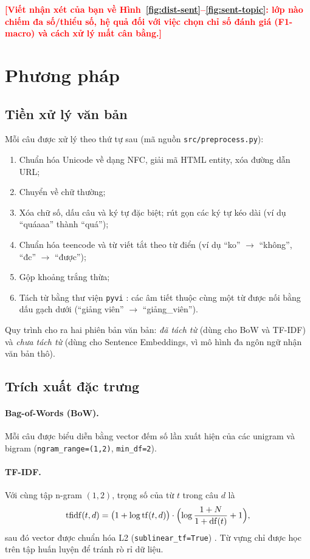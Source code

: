 \documentclass[12pt,a4paper]{article}
\newcommand{\todo}[1]{\textcolor{red}{\textbf{[#1]}}}
\begin{document}
\todo{Viết nhận xét của bạn về Hình~\ref{fig:dist-sent}--\ref{fig:sent-topic}: lớp nào chiếm đa số/thiểu số, hệ quả đối với việc chọn chỉ số đánh giá (F1-macro) và cách xử lý mất cân bằng.}

\section{Phương pháp}
\subsection{Tiền xử lý văn bản}
Mỗi câu được xử lý theo thứ tự sau (mã nguồn \texttt{src/preprocess.py}):
\begin{enumerate}
  \item Chuẩn hóa Unicode về dạng NFC, giải mã HTML entity, xóa đường dẫn URL;
  \item Chuyển về chữ thường;
  \item Xóa chữ số, dấu câu và ký tự đặc biệt; rút gọn các ký tự kéo dài (ví dụ ``quáaaa'' thành ``quá'');
  \item Chuẩn hóa teencode và từ viết tắt theo từ điển (ví dụ ``ko'' $\rightarrow$ ``không'', ``đc'' $\rightarrow$ ``được'');
  \item Gộp khoảng trắng thừa;
  \item Tách từ bằng thư viện \texttt{pyvi} \cite{pyvi}: các âm tiết thuộc cùng một từ được nối bằng dấu gạch dưới (``giảng viên'' $\rightarrow$ ``giảng\_viên'').
\end{enumerate}
Quy trình cho ra hai phiên bản văn bản: \emph{đã tách từ} (dùng cho BoW và TF-IDF) và \emph{chưa tách từ} (dùng cho Sentence Embeddings, vì mô hình đa ngôn ngữ nhận văn bản thô).

\subsection{Trích xuất đặc trưng}
\paragraph{Bag-of-Words (BoW).} Mỗi câu được biểu diễn bằng vector đếm số lần xuất hiện của các unigram và bigram (\texttt{ngram\_range=(1,2)}, \texttt{min\_df=2}).

\paragraph{TF-IDF.} Với cùng tập n-gram $(1,2)$, trọng số của từ $t$ trong câu $d$ là
\begin{equation}
  \mathrm{tfidf}(t,d) = \bigl(1+\log \mathrm{tf}(t,d)\bigr)\cdot \Bigl(\log\frac{1+N}{1+\mathrm{df}(t)} + 1\Bigr),
\end{equation}
sau đó vector được chuẩn hóa L2 (\texttt{sublinear\_tf=True}) \cite{manning2008ir}. Từ vựng chỉ được học trên tập huấn luyện để tránh rò rỉ dữ liệu.
\end{document}
